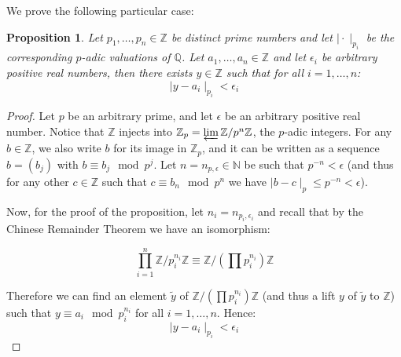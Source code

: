 \documentclass[12pt]{article}
\newtheorem{prop}{Proposition}
\newcommand{\Nats}{\mathbb{N}}
\newcommand{\Ints}{\mathbb{Z}}
\newcommand{\Rats}{\mathbb{Q}}
\begin{document}
We prove the following particular case:

\begin{prop}
Let $p_1,\ldots,p_n \in \Ints$ be distinct prime numbers and let $\mid\cdot\mid_{p_i}$ be the corresponding $p$-adic valuations of $\Rats$. Let $a_1,\ldots,a_n\in \Ints$ and let $\epsilon_i$ be arbitrary positive real numbers, then there exists $y\in\Ints$ such that for all $i=1,\ldots,n$:
$$\mid y - a_i \mid_{p_i} < \epsilon_i$$
\end{prop}
\begin{proof}
Let $p$ be an arbitrary prime, and let $\epsilon$ be an arbitrary positive real number. Notice that $\Ints$ injects into $\Ints_p=\varprojlim \Ints/p^n\Ints$, the $p$-adic integers. For any $b\in \Ints$, we also write $b$ for its image in $\Ints_p$, and it can be written as a sequence $b=(b_j)$ with $b\equiv b_j \mod p^j$. Let $n=n_{p,\epsilon}\in \Nats$ be such that $p^{-n} < \epsilon$ (and thus  for any other $c\in \Ints $ such that $c\equiv b_n \mod p^n$ we have $\mid b-c \mid_p \leq p^{-n} < \epsilon$).

Now, for the proof of the proposition, let $n_i=n_{p_i,\epsilon_i}$ and recall that by the Chinese Remainder Theorem we have an isomorphism:

$$\prod_{i=1}^n \Ints/p_i^{n_i}\Ints \equiv \Ints/(\prod p_i^{n_i})\Ints$$

Therefore we can find an element $\tilde{y}$ of $\Ints/(\prod p_i^{n_i})\Ints$ (and thus a lift $y$ of $\tilde{y}$ to $\Ints$) such that $y \equiv a_i \mod p_i^{n_i}$ for all $i=1,\ldots,n$. Hence:
$$\mid y - a_i \mid_{p_i} < \epsilon_i$$
\end{proof}
\end{document}
